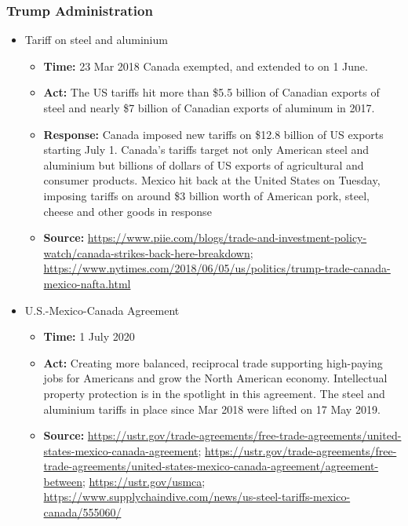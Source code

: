 		\subsubsection{Trump Administration}
			\begin{itemize}
			\item Tariff on steel and aluminium
				\begin{itemize}
				\item \textbf{Time: } 23 Mar 2018 Canada exempted, and extended to on 1 June.
				\item \textbf{Act: }The US tariffs hit more than  \$5.5 billion of Canadian exports of steel and nearly \$7 billion of Canadian exports of aluminum in 2017.
				\item \textbf{Response: }Canada imposed new tariffs on \$12.8 billion of US exports starting July 1. Canada's tariffs target not only American steel and aluminium but billions of dollars of US exports of agricultural and consumer products. Mexico hit back at the United States on Tuesday, imposing tariffs on around \$3 billion worth of American pork, steel, cheese and other goods in response
				\item	\textbf{Source: }\url{https://www.piie.com/blogs/trade-and-investment-policy-watch/canada-strikes-back-here-breakdown}; \url{https://www.nytimes.com/2018/06/05/us/politics/trump-trade-canada-mexico-nafta.html}
				\end{itemize}

			\item	U.S.-Mexico-Canada Agreement
				\begin{itemize}
				\item \textbf{Time: } 1 July 2020
				\item \textbf{Act: } Creating more balanced, reciprocal trade supporting high-paying jobs for Americans and grow the North American economy. Intellectual property protection is in the spotlight in this agreement. The steel and aluminium tariffs in place since Mar 2018 were lifted on 17 May 2019.
				\item	\textbf{Source: } \url{https://ustr.gov/trade-agreements/free-trade-agreements/united-states-mexico-canada-agreement}; \url{https://ustr.gov/trade-agreements/free-trade-agreements/united-states-mexico-canada-agreement/agreement-between}; \url{https://ustr.gov/usmca}; \url{https://www.supplychaindive.com/news/us-steel-tariffs-mexico-canada/555060/}
				\end{itemize}
			\end{itemize}
